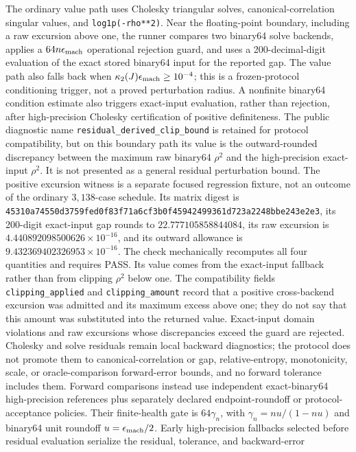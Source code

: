 The ordinary value path uses Cholesky triangular solves, canonical-correlation
singular values, and \texttt{log1p(-rho**2)}.  Near the floating-point boundary,
including a raw excursion above one, the runner compares two binary64 solve
backends, applies a $64n\epsilon_{\rm mach}$ operational rejection guard, and
uses a 200-decimal-digit evaluation of the exact stored binary64 input for the
reported gap.  The value path also falls back when
$\kappa_2(J)\epsilon_{\rm mach}\geq10^{-4}$; this is a frozen-protocol
conditioning trigger, not a proved perturbation radius.  A nonfinite binary64
condition estimate also triggers exact-input evaluation, rather than
rejection, after high-precision Cholesky certification of positive
definiteness.  The
public diagnostic name
\texttt{residual\_derived\_clip\_bound} is retained for protocol compatibility,
but on this boundary path its value is the outward-rounded discrepancy between
the maximum raw binary64 $\rho^2$ and the high-precision exact-input $\rho^2$.
It is not presented as a general residual perturbation bound.  The positive
excursion witness is a separate focused regression fixture, not an outcome of
the ordinary $3{,}138$-case schedule.  Its matrix digest is
\texttt{45310a74550d3759fed0f83f71a6cf3b0f45942499361d723a2248bbe243e2e3},
its 200-digit exact-input gap rounds to $22.777105858844084$, its raw excursion
is $4.440892098500626\times10^{-16}$, and its outward allowance is
$9.432369402326953\times10^{-16}$.  The check mechanically recomputes all four
quantities and requires PASS.  Its value comes from the exact-input fallback
rather than from clipping $\rho^2$ below one.  The compatibility
fields \texttt{clipping\_applied} and \texttt{clipping\_amount} record that a
positive cross-backend excursion was admitted and its maximum excess above
one; they do not say that this amount was substituted into the returned value.
Exact-input domain violations and raw excursions whose discrepancies exceed
the guard are rejected.  Cholesky and solve residuals remain local backward
diagnostics; the protocol does not promote them to canonical-correlation or
gap, relative-entropy, monotonicity, scale, or oracle-comparison forward-error
bounds, and no forward tolerance includes them.  Forward comparisons instead
use independent exact-binary64 high-precision references plus separately
declared endpoint-roundoff or protocol-acceptance policies.  Their
finite-health gate is $64\gamma_n$, with
$\gamma_n=n u/(1-n u)$ and binary64 unit roundoff
$u=\epsilon_{\rm mach}/2$.  Early high-precision fallbacks selected before
residual evaluation serialize the residual, tolerance, and backward-error

